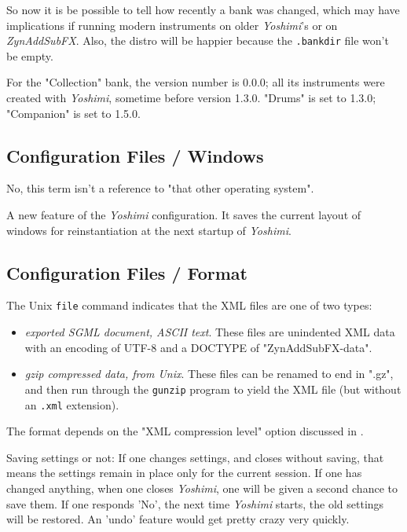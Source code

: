    So now it is be possible to tell how recently a bank was changed, which may
   have implications if running modern instruments on older \textsl{Yoshimi}'s or
   on \textsl{ZynAddSubFX}. Also, the distro will be happier because the
   \texttt{.bankdir} file won't be empty.

   For the "Collection" bank, the version number is 0.0.0; all its instruments
   were created with \textsl{Yoshimi}, sometime before version 1.3.0.  "Drums" is
   set to 1.3.0; "Companion" is set to 1.5.0.

\subsection{Configuration Files / Windows}
\label{subsec:configuration_windows}

   No, this term isn't a reference to "that other operating system".

   A new feature of the \textsl{Yoshimi} configuration.  It saves the current
   layout of windows for reinstantiation at the next startup of
   \textsl{Yoshimi}.

\subsection{Configuration Files / Format}
\label{subsec:configuration_file_format}

   The Unix \texttt{file} command indicates that the XML files are one of
   two types:

   \begin{itemize}
      \item \textsl{exported SGML document, ASCII text}.
         These files are unindented XML data with an encoding of UTF-8 and
         a DOCTYPE of "ZynAddSubFX-data".
      \item \textsl{gzip compressed data, from Unix}.
         These files can be renamed to end in ".gz", and then run through
         the \texttt{gunzip} program to yield the XML file (but without an
         \texttt{.xml} extension).
   \end{itemize}

   The format depends on the "XML compression level" option discussed in
   .

   Saving settings or not:
   If one changes settings, and closes without saving, that means the settings
   remain in place only for the current session. If one has changed anything,
   when one closes \textsl{Yoshimi}, one will be given a second chance to
   save them. If one responds 'No',  the next time \textsl{Yoshimi} starts,
   the old settings will be restored.  An 'undo' feature would get pretty
   crazy very quickly.

